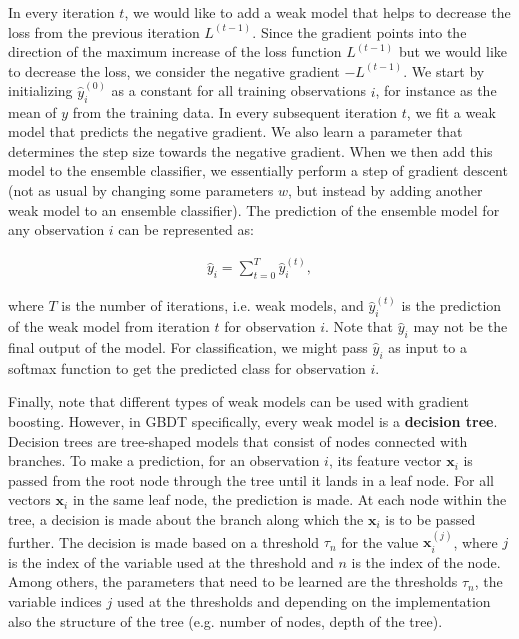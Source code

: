 \documentclass{article}
\begin{document}
	In every iteration $t$, we would like to add a weak model that helps to decrease the loss from the previous iteration $L^{(t-1)}$. Since the gradient points into the direction of the maximum increase of the loss function $L^{(t-1)}$ but we would like to decrease the loss, we consider the negative gradient $-L^{(t-1)}$.
	We start by initializing $\hat{y}_i^{(0)}$ as a constant for all training observations $i$, for instance as the mean of $y$ from the training data. In every subsequent iteration $t$, we fit a weak model that predicts the negative gradient. We also learn a parameter that determines the step size towards the negative gradient. When we then add this model to the ensemble classifier, we essentially perform a step of gradient descent (not as usual by changing some parameters $w$, but instead by adding another weak model to an ensemble classifier). The prediction of the ensemble model for any observation $i$ can be represented as:
	
	\begin{align}
	 \hat{y}_i = \sum_{t = 0}^T \hat{y}_i^{(t)}, 
	\end{align}
	
	where $T$ is the number of iterations, i.e. weak models, and $\hat{y}_i^{(t)}$ is the prediction of the weak model from iteration $t$ for observation $i$. Note that $\hat{y}_i$ may not be the final output of the model. For classification, we might pass $\hat{y}_i$ as input to a softmax function to get the predicted class for observation $i$.
	
	Finally, note that different types of weak models can be used with gradient boosting. However, in GBDT specifically, every weak model is a \textbf{decision tree}. Decision trees are tree-shaped models that consist of nodes connected with branches. To make a prediction, for an observation $i$, its feature vector $\textbf{x}_i$ is passed from the root node through the tree until it lands in a leaf node. For all vectors $\textbf{x}_i$ in the same leaf node, the prediction is made. At each node within the tree, a decision is made about the branch along which the $\textbf{x}_i$ is to be passed further. The decision is made based on a threshold $\tau_n$ for the value $\textbf{x}_{i}^{(j)}$, where $j$ is the index of the variable used at the threshold and $n$ is the index of the node. Among others, the parameters that need to be learned are the thresholds $\tau_n$, the variable indices $j$ used at the thresholds and depending on the implementation also the structure of the tree (e.g. number of nodes, depth of the tree).
	
\end{document}
